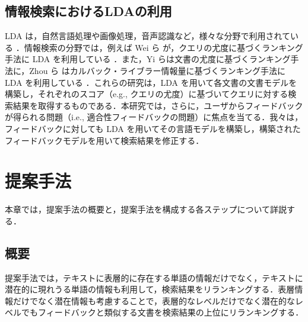 \documentclass[japanese]{jnlp_1.4}
\begin{document}
\subsection{情報検索におけるLDAの利用}

LDA は，自然言語処理や画像処理，音声認識など，様々な分野で利用されている
\cite{Blei2003,Fei-Fei2005,Heidel2007}．情報検索の分野では，例えば Wei ら
が，クエリの尤度に基づくランキング手法に LDA を利用している
\cite{Wei2006}．また，Yi らは文書の尤度に基づくランキング手法に，Zhou ら
はカルバック・ライブラー情報量に基づくランキング手法に LDA を利用している
\cite{Yi2009,Zhou2009}．これらの研究は，LDA を用いて各文書の文書モデルを
構築し，それぞれのスコア（e.g., クエリの尤度）に基づいてクエリに対する検
索結果を取得するものである．本研究では，さらに，ユーザからフィードバック
が得られる問題（i.e., 適合性フィードバックの問題）に焦点を当てる．我々は，
フィードバックに対しても LDA を用いてその言語モデルを構築し，構築された
フィードバックモデルを用いて検索結果を修正する．



\section{提案手法} \label{sec:proposed_method}

本章では，提案手法の概要と，提案手法を構成する各ステップについて詳説する．



\subsection{概要}

提案手法では，テキストに表層的に存在する単語の情報だけでなく，テキストに
潜在的に現れうる単語の情報も利用して，検索結果をリランキングする．表層情
報だけでなく潜在情報も考慮することで，表層的なレベルだけでなく潜在的なレ
ベルでもフィードバックと類似する文書を検索結果の上位にリランキングする．
\end{document}
